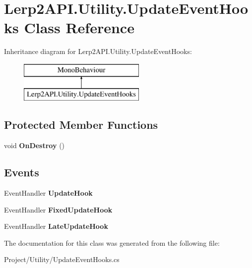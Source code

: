 \hypertarget{class_lerp2_a_p_i_1_1_utility_1_1_update_event_hooks}{}\section{Lerp2\+A\+P\+I.\+Utility.\+Update\+Event\+Hooks Class Reference}
\label{class_lerp2_a_p_i_1_1_utility_1_1_update_event_hooks}
Inheritance diagram for Lerp2\+A\+P\+I.\+Utility.\+Update\+Event\+Hooks\+:\begin{figure}[H]
\begin{center}
\leavevmode
\includegraphics[height=2.000000cm]{class_lerp2_a_p_i_1_1_utility_1_1_update_event_hooks}
\end{center}
\end{figure}
\subsection*{Protected Member Functions}
\begin{DoxyCompactItemize}
\item 
\mbox{\label{class_lerp2_a_p_i_1_1_utility_1_1_update_event_hooks_a8637b48cca300cd9ce624b7f66fbc971}} 
void {\bfseries On\+Destroy} ()
\end{DoxyCompactItemize}
\subsection*{Events}
\begin{DoxyCompactItemize}
\item 
\mbox{\label{class_lerp2_a_p_i_1_1_utility_1_1_update_event_hooks_ad883020c65023c5039dac40800bf9b01}} 
Event\+Handler {\bfseries Update\+Hook}
\item 
\mbox{\label{class_lerp2_a_p_i_1_1_utility_1_1_update_event_hooks_abf495c700e912311f6153dd67a64072d}} 
Event\+Handler {\bfseries Fixed\+Update\+Hook}
\item 
\mbox{\label{class_lerp2_a_p_i_1_1_utility_1_1_update_event_hooks_a8ef9fbd48cf07a3cf0c68b792f63fea6}} 
Event\+Handler {\bfseries Late\+Update\+Hook}
\end{DoxyCompactItemize}


The documentation for this class was generated from the following file\+:\begin{DoxyCompactItemize}
\item 
Project/\+Utility/Update\+Event\+Hooks.\+cs\end{DoxyCompactItemize}
